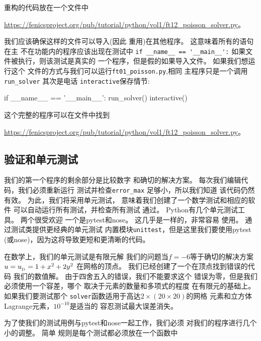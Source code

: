 
重构的代码放在一个文件中
\begin{center}
\url{https://fenicsproject.org/pub/tutorial/python/vol1/ft12_poisson_solver.py}。
\end{center}
我们应该确保这样的文件可以导入(因此
重用)在其他程序。 这意味着所有的语句在主
不在功能内的程序应该出现在测试中
\verb!if __name__ == '__main__':! 如果文件被执行，则该测试是真实的
一个程序，但是假的如果导入文件。 如果我们想运行这个
文件的方式与我们可以运行\verb!ft01_poisson.py!,相同
主程序只是一个调用\verb!run_solver! 其次是电话
\texttt{interactive}保存情节:

\begin{python}
if __name__ == '__main__':
    run_solver()
    interactive()
\end{python}
这个完整的程序可以在文件中找到
\begin{center}
\url{https://fenicsproject.org/pub/tutorial/python/vol1/ft12_poisson_solver.py}。
\end{center}


\subsection{验证和单元测试}


我们的第一个程序的剩余部分是比较数字
和确切的解决方案。 每次我们编辑代码，我们必须重新运行
测试并检查\verb!error_max! 足够小，所以我们知道
该代码仍然有效。 为此，我们将采用单元测试，
意味着我们创建了一个数学测试和相应的软件
可以自动运行所有测试，并检查所有测试
通过。 Python有几个单元测试工具。 两个很受欢迎
一个是pytest和nose。 这几乎是一样的，非常容易
使用。 通过测试类提供更经典的单元测试
内置模块\texttt{unittest}，但是这里我们要使用pytest
(或nose)，因为这将导致更短和更清晰的代码。

在数学上，我们的单元测试是有限元解
我们的问题当$f=-6$等于确切的解决方案$u=u_{_\mathrm{D}}=1+x^2+2y^2$
在网格的顶点。
我们已经创建了一个在顶点找到错误的代码
我们的数值解。 由于四舍五入的错误，我们不能要求这个
错误为零，但是我们必须使用一个容差，哪个
取决于元素的数量和多项式的程度
在有限元的基础上。 如果我们要测试那个
\texttt{solver}函数适用于高达$2\times(20\times 20)$的网格
元素和立方体Lagrange元素，$10^{-10}$是适当的
容忍测试最大误差消失。

为了使我们的测试用例与pytest和nose一起工作，我们必须
对我们的程序进行几个小的调整。 简单
规则是每个测试都必须放在一个函数中

